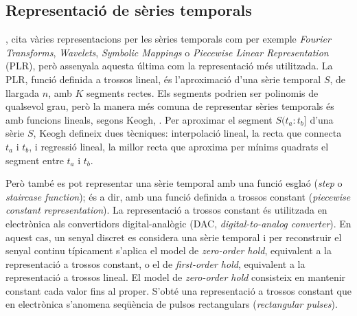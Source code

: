 

\subsection{Representació de sèries temporals}

\textcite{last:keogh}, cita vàries representacions per les sèries temporals com per exemple \emph{Fourier Transforms}, \emph{Wavelets}, \emph{Symbolic Mappings} o \emph{Piecewise Linear Representation} (PLR), però assenyala aquesta última com la representació més utilitzada. 
La PLR, funció definida a trossos lineal, és l'aproximació d'una sèrie temporal $S$, de llargada $n$, amb $K$ segments rectes. Els segments podrien ser polinomis de qualsevol grau, però la manera més comuna de representar sèries temporals és amb funcions lineals, segons Keogh, \cite{keogh02}.
Per aproximar el segment $S(t_a:t_b]$ d'una sèrie $S$, Keogh defineix dues tècniques: interpolació lineal, la recta que connecta $t_a$ i $t_b$, i regressió lineal, la millor recta que aproxima per mínims quadrats el segment entre $t_a$ i $t_b$.

Però també es pot representar una sèrie temporal amb una funció esglaó (\emph{step} o \emph{staircase function}); és a dir, amb una funció definida a trossos constant (\emph{piecewise constant representation}).
La representació a trossos constant és utilitzada en electrònica als convertidors digital-analògic (DAC, \emph{digital-to-analog converter}). En aquest cas, un senyal discret es considera una sèrie temporal i per reconstruir el senyal continu típicament s'aplica el model de \emph{zero-order hold}, equivalent a la representació a trossos constant,  o el de \emph{first-order hold},  equivalent a la representació a trossos lineal.
El model de \emph{zero-order hold} consisteix en mantenir constant cada valor fins al proper. S'obté una representació a trossos constant que en electrònica s'anomena seqüència de pulsos rectangulars (\emph{rectangular pulses}).

